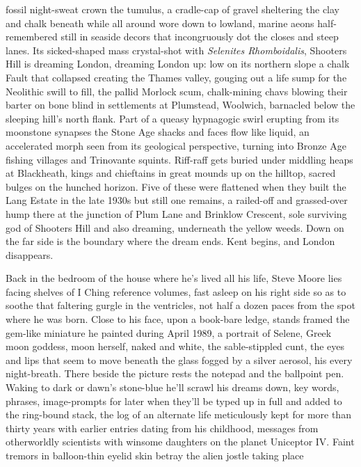 \documentclass[
]{article}
\begin{document}
fossil night-sweat crown the tumulus, a cradle-cap of gravel sheltering
the clay and chalk beneath while all around wore down to lowland, marine
aeons half-remembered still in seaside decors that incongruously dot the
closes and steep lanes. Its sicked-shaped mass crystal-shot with
\emph{Selenites Rhomboidalis}, Shooters Hill is dreaming London,
dreaming London up: low on its northern slope a chalk Fault that
collapsed creating the Thames valley, gouging out a life sump for the
Neolithic swill to fill, the pallid Morlock scum, chalk-mining chavs
blowing their barter on bone blind in settlements at Plumstead,
Woolwich, barnacled below the sleeping hill's north flank. Part of a
queasy hypnagogic swirl erupting from its moonstone synapses the Stone
Age shacks and faces flow like liquid, an accelerated morph seen from
its geological perspective, turning into Bronze Age fishing villages and
Trinovante squints. Riff-raff gets buried under middling heaps at
Blackheath, kings and chieftains in great mounds up on the hilltop,
sacred bulges on the hunched horizon. Five of these were flattened when
they built the Lang Estate in the late 1930s but still one remains, a
railed-off and grassed-over hump there at the junction of Plum Lane and
Brinklow Crescent, sole surviving god of Shooters Hill and also
dreaming, underneath the yellow weeds. Down on the far side is the
boundary where the dream ends. Kent begins, and London disappears. \par
Back in the bedroom of the house where he's lived all his life,
Steve Moore lies facing shelves of I Ching reference volumes, fast
asleep on his right side so as to soothe that faltering gurgle in the
ventricles, not half a dozen paces from the spot where he was born.
Close to his face, upon a book-bare ledge, stands framed the gem-like
miniature he painted during April 1989, a portrait of Selene, Greek moon
goddess, moon herself, naked and white, the sable-stippled cunt, the
eyes and lips that seem to move beneath the glass fogged by a silver
aerosol, his every night-breath. There beside the picture rests the
notepad and the ballpoint pen. Waking to dark or dawn's stone-blue he'll
scrawl his dreams down, key words, phrases, image-prompts for later when
they'll be typed up in full and added to the ring-bound stack, the log
of an alternate life meticulously kept for more than thirty years with
earlier entries dating from his childhood, messages from otherworldly
scientists with winsome daughters on the planet Uniceptor IV. Faint
tremors in balloon-thin eyelid skin betray the alien jostle taking place
\end{document}
